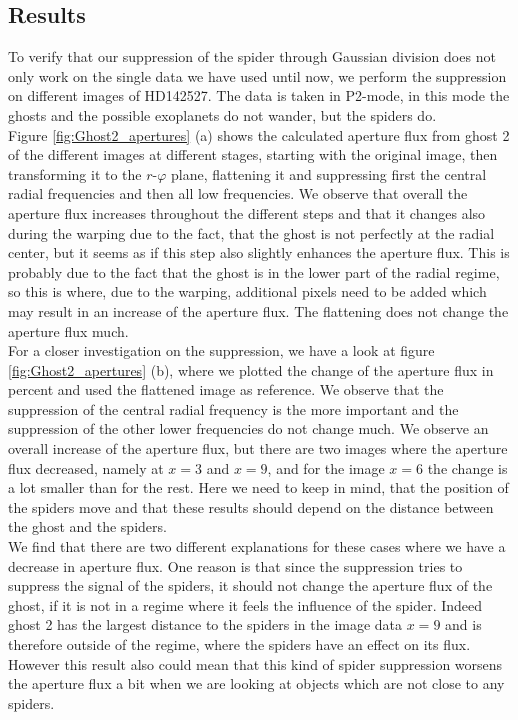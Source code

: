 \subsection{Results}
To verify that our suppression of the spider through Gaussian division does not only work on the single data we have used until now, we perform the suppression on different images of HD142527. The data is taken in P2-mode, in this mode the ghosts and the possible exoplanets do not wander, but the spiders do. \\
Figure \ref{fig:Ghost2_apertures} (a) shows the calculated aperture flux from ghost 2 of the different images at different stages, starting with the original image, then transforming it to the $r$-$\varphi$ plane, flattening it and suppressing first the central radial frequencies and then all low frequencies. We observe that overall the aperture flux increases throughout the different steps and that it changes also during the warping due to the fact, that the ghost is not perfectly at the radial center, but it seems as if this step also slightly enhances the aperture flux. This is probably due to the fact that the ghost is in the lower part of the radial regime, so this is where, due to the warping, additional pixels need to be added which may result in an increase of the aperture flux. The flattening does not change the aperture flux much.\\
For a closer investigation on the suppression, we have a look at figure \ref{fig:Ghost2_apertures} (b), where we plotted the change of the aperture flux in percent and used the flattened image as reference. We observe that the suppression of the central radial frequency is the more important and the suppression of the other lower frequencies do not change much. We observe an overall increase of the aperture flux, but there are two images where the aperture flux decreased, namely at $x=3$ and $x=9$, and for the image $x=6$ the change is a lot smaller than for the rest. Here we need to keep in mind, that the position of the spiders move and that these results should depend on the distance between the ghost and the spiders. \\
We find that there are two different explanations for these cases where we have a decrease in aperture flux. One reason is that since the suppression tries to suppress the signal of the spiders, it should not change the aperture flux of the ghost, if it is not in a regime where it feels the influence of the spider. Indeed ghost 2 has the largest distance to the spiders in the image data $x=9$ and is therefore outside of the regime, where the spiders have an effect on its flux. However this result also could mean that this kind of spider suppression worsens the aperture flux a bit when we are looking at objects which are not close to any spiders.\\
